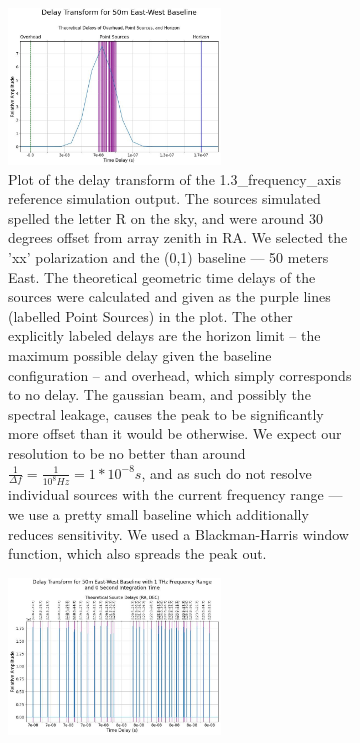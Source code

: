 \documentclass{article}
\begin{document}
\begin{figure}[htbp]
    \centering
    \begin{subfigure}[b]{1.0\textwidth}
        \centering
        \includegraphics[width=0.62\textwidth]{documentation_figures/delay_transform.jpg}
        \caption{Plot of the delay transform of the 1.3\_frequency\_axis reference simulation output. The sources simulated spelled the letter R on the sky, and were around 30 degrees offset from array zenith in RA. We selected the 'xx' polarization and the (0,1) baseline --- 50 meters East. The theoretical geometric time delays of the sources were calculated and given as the purple lines (labelled Point Sources) in the plot. The other  explicitly labeled delays are the horizon limit -- the maximum possible delay given the baseline configuration -- and overhead, which simply corresponds to no delay. The gaussian beam, and possibly the spectral leakage, causes the peak to be significantly more offset than it would be otherwise. We expect our resolution to be no better than around $\frac{1}{\Delta f} = \frac{1}{10^{8} Hz} = 1*10^{-8} s$, and as such do not resolve individual sources with the current frequency range --- we use a pretty small baseline which additionally reduces sensitivity. We used a Blackman-Harris window function, which also spreads the peak out.}
        \label{fig:delaytransform}
    \end{subfigure}
    \begin{subfigure}[b]{1.0\textwidth}
        \centering
        \includegraphics[width=0.62\textwidth]{documentation_figures/theoretical_delay_transform.jpg}

\end{subfigure}
\end{figure}
\end{document}
